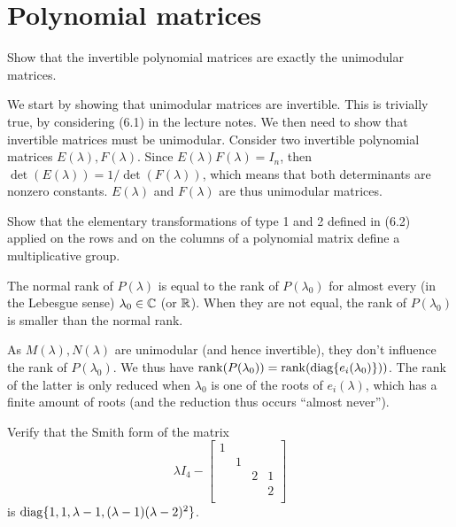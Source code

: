 \section{Polynomial matrices}

Show that the invertible polynomial matrices are exactly the unimodular matrices.

\begin{solution}
We start by showing that unimodular matrices are invertible.
This is trivially true, by considering (6.1) in the lecture notes.
We then need to show that invertible matrices must be unimodular.
Consider two invertible polynomial matrices \(E(\lambda), F(\lambda)\).
Since \(E(\lambda)F(\lambda) = I_n\), then \(\det(E(\lambda)) = 1/\det(F(\lambda))\), which means that both determinants are nonzero constants.
\(E(\lambda)\) and \(F(\lambda)\) are thus unimodular matrices.
\end{solution}

Show that the elementary transformations of type 1 and 2 defined in (6.2) applied on the rows and on the columns of a polynomial matrix define a multiplicative group.

\nosolution


The normal rank of \(P(\lambda)\) is equal to the rank of \(P(\lambda_0)\) for almost every (in the Lebesgue sense) \(\lambda_0 \in \mathbb{C}\) (or \(\mathbb{R}\)).
When they are not equal, the rank of \(P(\lambda_0)\) is smaller than the normal rank.

\begin{solution}
As \(M(\lambda), N(\lambda)\) are unimodular (and hence invertible), they don't influence the rank of \(P(\lambda_0)\).
We thus have \(\mathop{\mathrm{rank}}(P(\lambda_0)) = \mathop{\mathrm{rank}}(\operatorname{diag}\{e_i(\lambda_0)\}))\).
The rank of the latter is only reduced when \(\lambda_0\) is one of the roots of \(e_i(\lambda)\), which has a finite amount of roots (and the reduction thus occurs ``almost never'').
\end{solution}

Verify that the Smith form of the matrix
\[
\lambda I_4 - \begin{bmatrix}
1 & & &\\
& 1 & &\\
&& 2 & 1\\
&&&2\\
\end{bmatrix}
\]
is \(\operatorname{diag}\{1, 1, \lambda-1, (\lambda-1)(\lambda-2)^2\}\).

